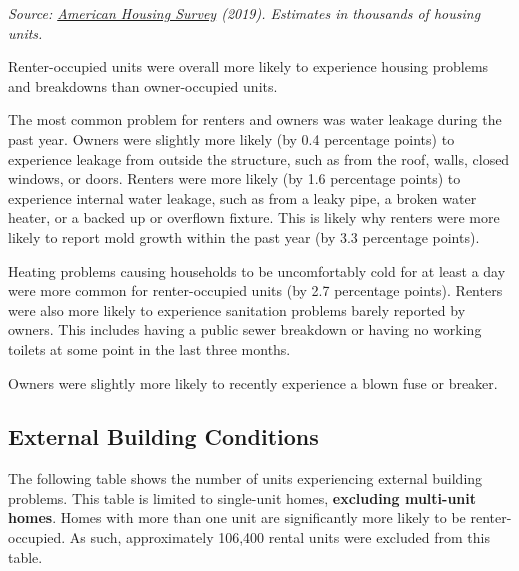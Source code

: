 \documentclass[
]{book}
\begin{document}
\emph{Source: \href{https://www.census.gov/newsroom/press-releases/2020/2019-american-housing-survey.html}{American Housing Survey} (2019). Estimates in thousands of housing units.}

Renter-occupied units were overall more likely to experience housing problems and breakdowns than owner-occupied units.

The most common problem for renters and owners was water leakage during the past year. Owners were slightly more likely (by 0.4 percentage points) to experience leakage from outside the structure, such as from the roof, walls, closed windows, or doors. Renters were more likely (by 1.6 percentage points) to experience internal water leakage, such as from a leaky pipe, a broken water heater, or a backed up or overflown fixture. This is likely why renters were more likely to report mold growth within the past year (by 3.3 percentage points).

Heating problems causing households to be uncomfortably cold for at least a day were more common for renter-occupied units (by 2.7 percentage points). Renters were also more likely to experience sanitation problems barely reported by owners. This includes having a public sewer breakdown or having no working toilets at some point in the last three months.

Owners were slightly more likely to recently experience a blown fuse or breaker.

\hypertarget{external-building-conditions}{%
\subsection{External Building Conditions}\label{external-building-conditions}}

The following table shows the number of units experiencing external building problems. This table is limited to single-unit homes, \textbf{excluding multi-unit homes}. Homes with more than one unit are significantly more likely to be renter-occupied. As such, approximately 106,400 rental units were excluded from this table.
\end{document}
